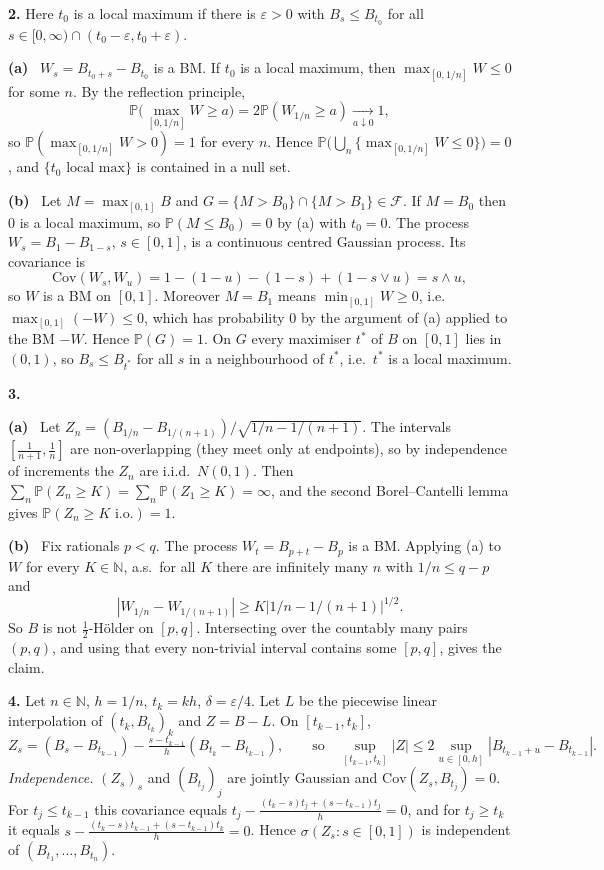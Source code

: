 \documentclass[11pt,a4paper]{article}
\renewcommand{\P}{\mathbb{P}}
\newcommand{\N}{\mathbb{N}}
\newcommand{\F}{\mathcal{F}}
\newcommand{\1}{\mathbf{1}}
\newcommand{\prob}[1]{\par\medskip\noindent\textbf{#1}\quad}
\newcommand{\sub}[1]{\par\smallskip\noindent\textbf{#1}\ }
\begin{document}
\prob{2.}
Here $t_0$ is a local maximum if there is $\varepsilon>0$ with $B_s\le B_{t_0}$ for all
$s\in[0,\infty)\cap(t_0-\varepsilon,t_0+\varepsilon)$.

\sub{(a)} $W_s=B_{t_0+s}-B_{t_0}$ is a BM. If $t_0$ is a local maximum, then $\max_{[0,1/n]}W\le0$ for some $n$.
By the reflection principle,
\[\P\big(\max_{[0,1/n]}W\ge a\big)=2\P(W_{1/n}\ge a)\xrightarrow[a\downarrow0]{}1,\]
so $\P(\max_{[0,1/n]}W>0)=1$ for every $n$. Hence
$\P\big(\bigcup_n\{\max_{[0,1/n]}W\le0\}\big)=0$, and $\{t_0\text{ local max}\}$ is contained in a null set.

\sub{(b)} Let $M=\max_{[0,1]}B$ and $G=\{M>B_0\}\cap\{M>B_1\}\in\F$. If $M=B_0$ then $0$ is a local maximum, so
$\P(M\le B_0)=0$ by (a) with $t_0=0$. The process
$W_s=B_1-B_{1-s}$, $s\in[0,1]$, is a continuous centred Gaussian process. Its covariance is
\[
\mathrm{Cov}(W_s,W_u)=1-(1-u)-(1-s)+(1-s\vee u)=s\wedge u,
\]
so $W$ is a BM on $[0,1]$. Moreover $M=B_1$ means $\min_{[0,1]}W\ge0$, i.e.\ $\max_{[0,1]}(-W)\le0$, which has
probability $0$ by the argument of (a) applied to the BM $-W$. Hence $\P(G)=1$. On $G$ every maximiser $t^*$ of $B$ on
$[0,1]$ lies in $(0,1)$, so $B_s\le B_{t^*}$ for all $s$ in a neighbourhood of $t^*$, i.e.\ $t^*$ is a local maximum.

\prob{3.}
\sub{(a)} Let $Z_n=(B_{1/n}-B_{1/(n+1)})/\sqrt{1/n-1/(n+1)}$. The intervals $[\frac1{n+1},\frac1n]$ are
non-overlapping (they meet only at endpoints), so by independence of increments the $Z_n$ are i.i.d.\ $N(0,1)$. Then $\sum_n\P(Z_n\ge K)=\sum_n\P(Z_1\ge K)=\infty$, and the second Borel--Cantelli
lemma gives $\P(Z_n\ge K\text{ i.o.})=1$.

\sub{(b)} Fix rationals $p<q$. The process $W_t=B_{p+t}-B_p$ is a BM. Applying (a) to $W$ for every $K\in\N$, a.s.\ for all $K$
there are infinitely many $n$ with $1/n\le q-p$ and
\[|W_{1/n}-W_{1/(n+1)}|\ge K|1/n-1/(n+1)|^{1/2}.\]
So $B$ is not $\frac12$-H\"older on $[p,q]$. Intersecting over the countably many pairs $(p,q)$, and using that every
non-trivial interval contains some $[p,q]$, gives the claim.

\prob{4.}
Let $n\in\N$, $h=1/n$, $t_k=kh$, $\delta=\varepsilon/4$. Let $L$ be the piecewise linear interpolation of
$(t_k,B_{t_k})_k$ and $Z=B-L$. On $[t_{k-1},t_k]$,
\[
Z_s=(B_s-B_{t_{k-1}})-\tfrac{s-t_{k-1}}{h}(B_{t_k}-B_{t_{k-1}}),\qquad\text{so}\quad
\sup_{[t_{k-1},t_k]}|Z|\le2\sup_{u\in[0,h]}|B_{t_{k-1}+u}-B_{t_{k-1}}|.
\]
\emph{Independence.} $(Z_s)_s$ and $(B_{t_j})_j$ are jointly Gaussian and
$\mathrm{Cov}(Z_s,B_{t_j})=0$. For $t_j\le t_{k-1}$ this covariance equals
$t_j-\frac{(t_k-s)t_j+(s-t_{k-1})t_j}{h}=0$, and for $t_j\ge t_k$ it equals
$s-\frac{(t_k-s)t_{k-1}+(s-t_{k-1})t_k}{h}=0$. Hence $\sigma(Z_s:s\in[0,1])$ is independent of
$(B_{t_1},\dots,B_{t_n})$.
\end{document}
